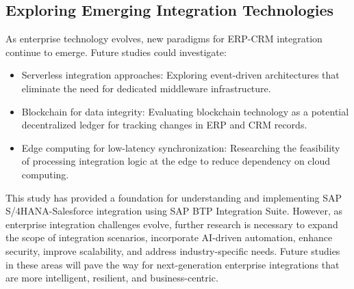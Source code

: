 \subsection{Exploring Emerging Integration Technologies}
As enterprise technology evolves, new paradigms for ERP-CRM integration continue to emerge. Future studies could investigate:

\begin{itemize}
    \item Serverless integration approaches: Exploring event-driven architectures that eliminate the need for dedicated middleware infrastructure.
    \item Blockchain for data integrity: Evaluating blockchain technology as a potential decentralized ledger for tracking changes in ERP and CRM records.
    \item Edge computing for low-latency synchronization: Researching the feasibility of processing integration logic at the edge to reduce dependency on cloud computing.
\end{itemize}

This study has provided a foundation for understanding and implementing SAP S/4HANA-Salesforce integration using SAP BTP Integration Suite. However, as enterprise integration challenges evolve, further research is necessary to expand the scope of integration scenarios, incorporate AI-driven automation, enhance security, improve scalability, and address industry-specific needs. Future studies in these areas will pave the way for next-generation enterprise integrations that are more intelligent, resilient, and business-centric.


\newpage
